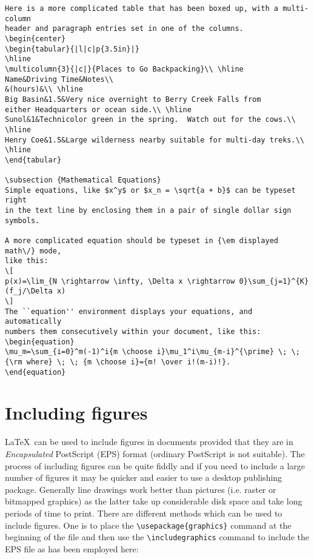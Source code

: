\documentclass[11pt,oneside]{book}
\begin{document}
\begin{verbatim}
Here is a more complicated table that has been boxed up, with a multi-column
header and paragraph entries set in one of the columns.
\begin{center}
\begin{tabular}{|l|c|p{3.5in}|}
\hline
\multicolumn{3}{|c|}{Places to Go Backpacking}\\ \hline
Name&Driving Time&Notes\\
&(hours)&\\ \hline
Big Basin&1.5&Very nice overnight to Berry Creek Falls from
either Headquarters or ocean side.\\ \hline
Sunol&1&Technicolor green in the spring.  Watch out for the cows.\\ \hline
Henry Coe&1.5&Large wilderness nearby suitable for multi-day treks.\\ \hline
\end{tabular}

\subsection {Mathematical Equations}
Simple equations, like $x^y$ or $x_n = \sqrt{a + b}$ can be typeset right
in the text line by enclosing them in a pair of single dollar sign symbols.

A more complicated equation should be typeset in {\em displayed math\/} mode,
like this:
\[
p(x)=\lim_{N \rightarrow \infty, \Delta x \rightarrow 0}\sum_{j=1}^{K}(f_j/\Delta x)
\]
The ``equation'' environment displays your equations, and automatically
numbers them consecutively within your document, like this:
\begin{equation}
\mu_m=\sum_{i=0}^m(-1)^i{m \choose i}\mu_1^i\mu_{m-i}^{\prime} \; \; {\rm where} \; \; {m \choose i}={m! \over i!(m-i)!}.
\end{equation}

\end{verbatim}
\section{Including figures}
\LaTeX \ can be used to include figures in documents provided that
they are in {\em Encapsulated} PostScript (EPS) format (ordinary PostScript
is not suitable). The process of including figures can be quite
fiddly and if you need to include a large number of figures it
may be quicker and easier to use a desktop publishing package.
Generally line drawings work better than pictures (i.e. raster
or bitmapped graphics) as the latter take up considerable disk space
and take long periods of time to print. There are different methods
which can be used to include figures. One is to place the
\verb+\usepackage{graphics}+ command at the beginning of the file
and then use the
\verb+\includegraphics+ command to include
the EPS file as has been employed here:
\end{document}
